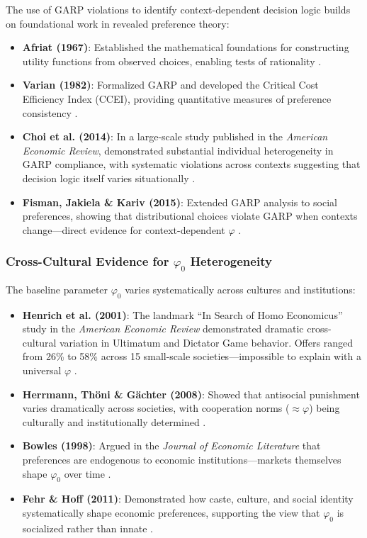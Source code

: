 The use of GARP violations to identify context-dependent decision logic builds on foundational work in revealed preference theory:

\begin{itemize}
\item \textbf{Afriat (1967)}: Established the mathematical foundations for constructing utility functions from observed choices, enabling tests of rationality \cite{afriat1967}.

\item \textbf{Varian (1982)}: Formalized GARP and developed the Critical Cost Efficiency Index (CCEI), providing quantitative measures of preference consistency \cite{varian1982}.

\item \textbf{Choi et al. (2014)}: In a large-scale study published in the \textit{American Economic Review}, demonstrated substantial individual heterogeneity in GARP compliance, with systematic violations across contexts suggesting that decision logic itself varies situationally \cite{choi2014}.

\item \textbf{Fisman, Jakiela \& Kariv (2015)}: Extended GARP analysis to social preferences, showing that distributional choices violate GARP when contexts change---direct evidence for context-dependent $\varphi$ \cite{fisman2015}.
\end{itemize}

\subsubsection{Cross-Cultural Evidence for $\varphi_0$ Heterogeneity}

The baseline parameter $\varphi_0$ varies systematically across cultures and institutions:

\begin{itemize}
\item \textbf{Henrich et al. (2001)}: The landmark ``In Search of Homo Economicus'' study in the \textit{American Economic Review} demonstrated dramatic cross-cultural variation in Ultimatum and Dictator Game behavior. Offers ranged from 26\% to 58\% across 15 small-scale societies---impossible to explain with a universal $\varphi$ \cite{henrich2001}.

\item \textbf{Herrmann, Thöni \& Gächter (2008)}: Showed that antisocial punishment varies dramatically across societies, with cooperation norms ($\approx \varphi$) being culturally and institutionally determined \cite{herrmann2008}.

\item \textbf{Bowles (1998)}: Argued in the \textit{Journal of Economic Literature} that preferences are endogenous to economic institutions---markets themselves shape $\varphi_0$ over time \cite{bowles1998}.

\item \textbf{Fehr \& Hoff (2011)}: Demonstrated how caste, culture, and social identity systematically shape economic preferences, supporting the view that $\varphi_0$ is socialized rather than innate \cite{fehrhoff2011}.
\end{itemize}

